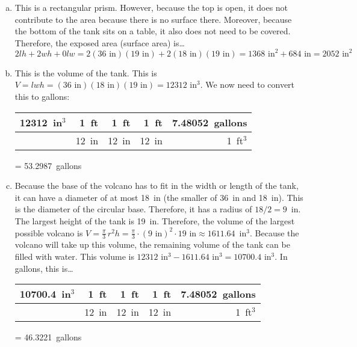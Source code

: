 \documentclass[11pt,letterpaper]{article}
\begin{document}
\sol
\begin{enumerate}[(a)]
\item This is a rectangular prism. However, because the top is open, it does not contribute to the area because there is no surface there. Moreover, because the bottom of the tank sits on a table, it also does not need to be covered. Therefore, the exposed area (surface area) is\dots
	\[
	2lh + 2wh + 0lw= 2(36 \text{ in})(19\text{ in}) + 2(18 \text{ in})(19 \text{ in})= 1368 \text{ in}^2 + 684 \text{ in}= 2052 \text{ in}^2
	\] \pspace

\item This is the volume of the tank. This is $V= lwh= (36 \text{ in})(18 \text{ in})(19 \text{ in})= 12312 \text{ in}^3$. We now need to convert this to gallons: \par
	\begin{table}[!ht]
	\centering
	\begin{tabular}{r|r|r|r|r}
	 12312~in$^3$ & 1~ft 	& 1~ft & 1~ft & 7.48052~gallons \\ \hline
				& 12~in & 12~in & 12~in & 1~ft$^3$
	\end{tabular}
	= 53.2987~gallons
	\end{table} \pspace

\item Because the base of the volcano has to fit in the width or length of the tank, it can have a diameter of at most 18~in (the smaller of 36~in and 18~in). This is the diameter of the circular base. Therefore, it has a radius of $18/2= 9$~in. The largest height of the tank is 19~in. Therefore, the volume of the largest possible volcano is $V= \frac{\pi}{3}\, r^2 h= \frac{\pi}{3} \cdot (9 \text{ in})^2 \cdot 19 \text{ in} \approx  1611.64$~in$^3$. Because the volcano will take up this volume, the remaining volume of the tank can be filled with water. This volume is $12312 \text{ in}^3 - 1611.64 \text{ in}^3= 10700.4 \text{ in}^3$. In gallons, this is\dots \par
	\begin{table}[!ht]
	\centering
	\begin{tabular}{r|r|r|r|r}
	 10700.4~in$^3$ & 1~ft 	& 1~ft & 1~ft & 7.48052~gallons \\ \hline
				& 12~in & 12~in & 12~in & 1~ft$^3$
	\end{tabular}
	= 46.3221~gallons
	\end{table} 
\end{enumerate}
\end{document}
